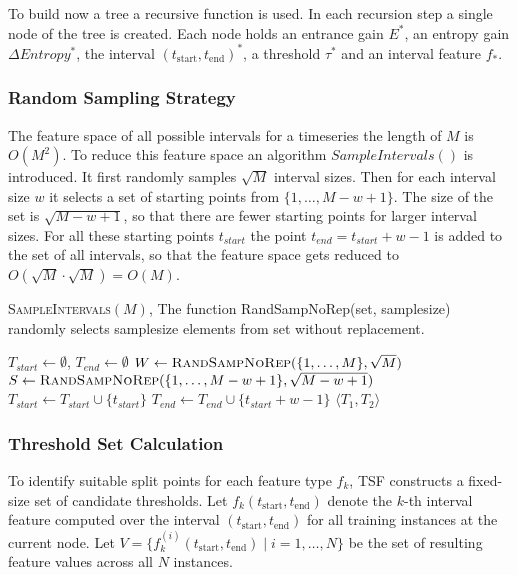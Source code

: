 To build now a tree a recursive function is used. In each recursion step a single node of the 
tree is created. Each node holds an entrance gain $E^*$, an entropy gain $\Delta Entropy^*$, the 
interval $(t_{\mathrm{start}}, t_{\mathrm{end}})^*$, a threshold $\tau^*$ and an interval feature $f_*$.

\subsubsection*{Random Sampling Strategy}
The feature space of all possible intervals for a timeseries the length of $M$
is $O(M^2)$. To reduce this feature space an algorithm $SampleIntervals()$ is introduced. %
It first randomly samples $\sqrt{M}$ interval sizes. Then for each interval size $w$ it selects
a set of starting points from $\{1, \dots, M-w+1\}$. The size of the set is $\sqrt{M - w + 1}$, so that 
there are fewer starting points for larger interval sizes. For all these starting points $t_{start}$ the point 
$t_{end} = t_{start} + w - 1 $ is added to the set of all intervals, so that the feature space gets reduced to 
$O(\sqrt{M} \cdot \sqrt{M}) = O(M)$.

\begin{algorithm}[H]
\caption{\textsc{SampleIntervals}$(M)$, The function RandSampNoRep(set, samplesize)
randomly selects samplesize elements from set without replacement.}
\begin{algorithmic}[1]
\State $T_{start} \gets \emptyset$, $T_{end} \gets \emptyset$
\State $W \gets \textsc{RandSampNoRep}(\{1, \dots, M\}, \sqrt{M})$
    \State $S \gets \textsc{RandSampNoRep}(\{1, \dots, M - w + 1\}, \sqrt{M - w + 1})$
        \State $T_{start} \gets T_{start} \cup \{t_{start}\}$
        \State $T_{end}  \gets T_{end}  \cup \{t_{start}  + w - 1\}$
    \EndFor
\EndFor
\State \Return $\langle T_1, T_2 \rangle$
\end{algorithmic}
\end{algorithm}

\subsubsection*{Threshold Set Calculation}

To identify suitable split points for each feature type $f_k$, 
TSF constructs a fixed-size set of candidate thresholds. 
Let $f_k (t_{\mathrm{start}}, t_{\mathrm{end}})$ denote the $k$-th interval feature 
computed over 
the interval $(t_{\mathrm{start}}, t_{\mathrm{end}})$ for all training instances at 
the current node. Let $V = \{ f_k^{(i)} (t_{\mathrm{start}}, t_{\mathrm{end}}) \mid i = 1, \dots, N \}$ 
be the set of resulting feature values across all $N$ 
instances.

